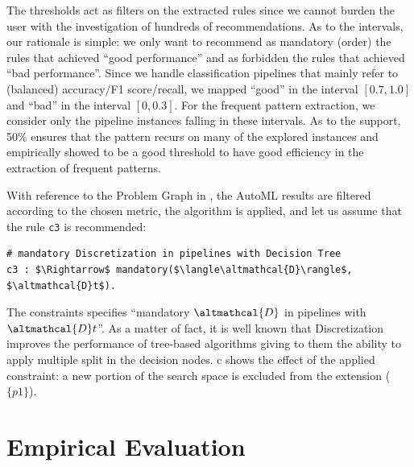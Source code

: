 The thresholds act as filters on the extracted rules since we cannot burden the user with the investigation of hundreds of recommendations. 
As to the intervals, our rationale is simple: we only want to recommend as mandatory (order) the rules that achieved ``good performance'' and as forbidden the rules that achieved ``bad performance''.
Since we handle classification pipelines that mainly refer to (balanced) accuracy/F1 score/recall, we mapped ``good'' in the interval $[0.7, 1.0]$ and ``bad'' in the interval $[0, 0.3]$. For the frequent pattern extraction, we consider only the pipeline instances falling in these intervals.
As to the support, 50\% ensures that the pattern recurs on many of the explored instances and empirically showed to be a good threshold to have good efficiency in the extraction of frequent patterns.

\begin{example}
With reference to the Problem Graph in ,
the AutoML results are filtered according to the chosen metric, the algorithm \cite{raschkas_2018_mlxtend} is applied, and let us assume that the rule \texttt{c3} is recommended:
\begin{lstlisting}[mathescape=true]
# mandatory Discretization in pipelines with Decision Tree
c3 : $\Rightarrow$ mandatory($\langle\altmathcal{D}\rangle$, $\altmathcal{D}t$).
\end{lstlisting}
The constraints specifies ``mandatory $\altmathcal{D}$ in pipelines with $\altmathcal{D}t$''.
As a matter of fact, it is well known that Discretization improves the performance of tree-based algorithms giving to them the ability to apply multiple split in the decision nodes.
c shows the effect of the applied constraint: a new portion of the search space is excluded from the extension ($\{p1\}$).
\end{example}


\section{Empirical Evaluation}\label{hamlet-sec:test}

